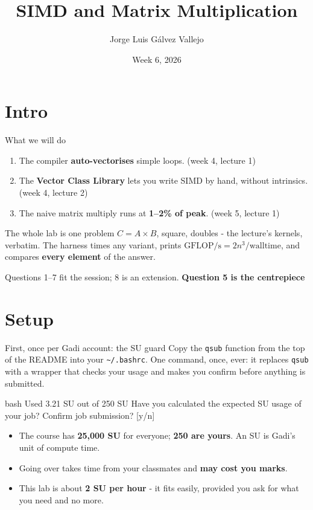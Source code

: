 \documentclass[aspectratio=169]{beamer}
\title[COMP3320 Lab 3]{SIMD and Matrix Multiplication}
\subtitle{}
\author[COMP3320 2026 \textperiodcentered\ Lab 3]{Jorge Luis G\'alvez Vallejo}
\institute{School of Computing}
\date{Week 6, 2026}
\newcommand{\cplx}[1]{{\footnotesize\color{cookieMuted}#1}}
\begin{document}
\maketitle

\section{Intro}

\begin{frame}{What we will do}
  \begin{enumerate}\setlength\itemsep{8pt}
    \item The compiler \textbf{auto-vectorises} simple loops. \cplx{(week 4, lecture 1)}
    \item The \textbf{Vector Class Library} lets you write SIMD by hand,
      without intrinsics. \cplx{(week 4, lecture 2)}
    \item The naive matrix multiply runs at \textbf{1--2\% of peak}.
      \cplx{(week 5, lecture 1)}
  \end{enumerate}
  \bigskip
  \begin{block}{The whole lab is one problem}
    $C = A \times B$, square, doubles - the lecture's kernels, verbatim.
    The harness times any variant, prints
    $\text{GFLOP/s} = 2n^{3}/\text{walltime}$, and compares
    \textbf{every element} of the answer.
  \end{block}
  \medskip
  Questions 1--7 fit the session; 8 is an extension.
  \textbf{Question 5 is the centrepiece}
\end{frame}

\section{Setup}

\begin{frame}[fragile]{First, once per Gadi account: the SU guard}
  Copy the \texttt{qsub} function from the top of the README into your
  \texttt{\textasciitilde/.bashrc}. One command, once, ever: it replaces
  \texttt{qsub} with a wrapper that checks your usage and makes you confirm
  before anything is submitted.
  \begin{cookiecode}[title={what you will see from then on}]{bash}
Used 3.21 SU out of 250 SU
Have you calculated the expected SU usage of your job?
Confirm job submission? [y/n]
  \end{cookiecode}
  \begin{itemize}\setlength\itemsep{3pt}
    \item The course has \textbf{25,000 SU} for everyone; \textbf{250 are
      yours}. \cplx{An SU is Gadi's unit of compute time.}
    \item Going over takes time from your classmates and \textbf{may cost you
      marks}.
    \item This lab is about \textbf{2 SU per hour} - it fits easily, provided
      you ask for what you need and no more.
  \end{itemize}
\end{frame}
\end{document}
